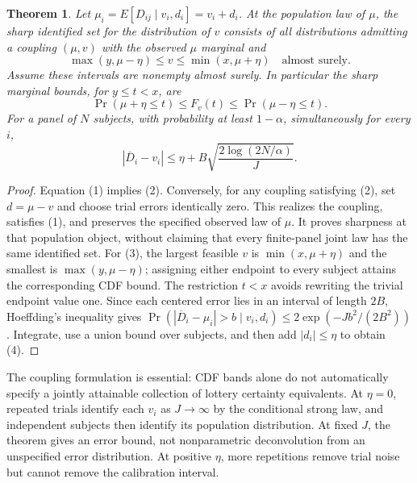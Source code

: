 \documentclass[11pt]{article}
\newtheorem{theorem}{Theorem}
\theoremstyle{definition}
\begin{document}
\begin{theorem}
Let $\mu_i=E[D_{ij}\mid v_i,d_i]=v_i+d_i$. At the population law of
$\mu$, the sharp identified set for the distribution of $v$ consists of
all distributions admitting a coupling $(\mu,v)$ with the observed
$\mu$ marginal and
\[
 \max(y,\mu-\eta)\le v\le\min(x,\mu+\eta)\quad\text{almost surely}. \tag{2}
\]
Assume these intervals are nonempty almost surely. In particular the
sharp marginal bounds, for $y\le t<x$, are
\[
 \Pr(\mu+\eta\le t)\le F_v(t)\le\Pr(\mu-\eta\le t).        \tag{3}
\]
For a panel of $N$ subjects, with probability at least $1-\alpha$,
simultaneously for every $i$,
\[
 |\overline D_i-v_i|\le
 \eta+B\sqrt{\frac{2\log(2N/\alpha)}{J}}.                 \tag{4}
\]
\end{theorem}
\begin{proof}
Equation (1) implies (2). Conversely, for any coupling satisfying (2),
set $d=\mu-v$ and choose trial errors identically zero. This realizes
the coupling, satisfies (1), and preserves the specified observed law
of $\mu$. It proves sharpness at that population object, without claiming
that every finite-panel joint law has the same identified set.
For (3), the largest feasible $v$ is $\min(x,\mu+\eta)$ and the
smallest is $\max(y,\mu-\eta)$; assigning either endpoint to every
subject attains the corresponding CDF bound. The restriction $t<x$
avoids rewriting the trivial endpoint value one. Since each centered
error lies in an interval of length $2B$, Hoeffding's inequality gives
$\Pr(|\overline D_i-\mu_i|>b\mid v_i,d_i)
\le2\exp(-Jb^2/(2B^2))$. Integrate, use a union bound over subjects,
and then add $|d_i|\le\eta$ to obtain (4).
\end{proof}
The coupling formulation is essential: CDF bands alone do not automatically
specify a jointly attainable collection of lottery certainty equivalents.
At $\eta=0$, repeated trials identify each $v_i$ as $J\to\infty$ by
the conditional strong law, and independent subjects then identify its
population distribution. At fixed $J$, the theorem gives an error bound,
not nonparametric deconvolution from an unspecified error distribution.
At positive $\eta$, more repetitions remove trial noise but cannot remove
the calibration interval.
\end{document}

